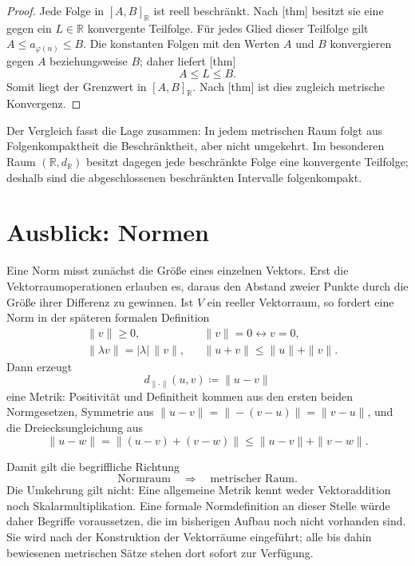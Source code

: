 \documentclass[main.tex]{subfiles}
\begin{document}
\begin{proof}
Jede Folge in \([A,B]_{\mathbb R}\) ist reell beschränkt. Nach
[thm] besitzt sie eine gegen
ein \(L\in\mathbb R\) konvergente Teilfolge. Für jedes Glied dieser
Teilfolge gilt \(A\leq a_{\varphi(n)}\leq B\). Die konstanten Folgen mit den
Werten \(A\) und \(B\) konvergieren gegen \(A\) beziehungsweise \(B\); daher
liefert
[thm]
\[
 A\leq L\leq B.
\]
Somit liegt der Grenzwert in \([A,B]_{\mathbb R}\). Nach
[thm] ist dies zugleich
metrische Konvergenz.
\end{proof}

Der Vergleich fasst die Lage zusammen: In jedem metrischen Raum folgt aus
Folgenkompaktheit die Beschränktheit, aber nicht umgekehrt. Im besonderen
Raum \((\mathbb R,d_{\mathbb R})\) besitzt dagegen jede beschränkte Folge
eine konvergente Teilfolge; deshalb sind die abgeschlossenen beschränkten
Intervalle folgenkompakt.

\chapter{Ausblick: Normen}

Eine Norm misst zunächst die Größe eines einzelnen Vektors. Erst die
Vektorraumoperationen erlauben es, daraus den Abstand zweier Punkte durch die
Größe ihrer Differenz zu gewinnen. Ist \(V\) ein reeller Vektorraum, so
fordert eine Norm in der späteren formalen Definition
\[
\begin{aligned}
 &\|v\|\geq0,
 &&\|v\|=0\leftrightarrow v=0,\\
 &\|\lambda v\|=|\lambda|\,\|v\|,
 &&\|u+v\|\leq\|u\|+\|v\|.
\end{aligned}
\]
Dann erzeugt
\[
 d_{\|\cdot\|}(u,v)\coloneqq\|u-v\|
\]
eine Metrik: Positivität und Definitheit kommen aus den ersten beiden
Normgesetzen, Symmetrie aus
\(\|u-v\|=\|-(v-u)\|=\|v-u\|\), und die Dreiecksungleichung aus
\[
 \|u-w\|=\|(u-v)+(v-w)\|
 \leq\|u-v\|+\|v-w\|.
\]

Damit gilt die begriffliche Richtung
\[
 \text{Normraum}\quad\Longrightarrow\quad\text{metrischer Raum}.
\]
Die Umkehrung gilt nicht: Eine allgemeine Metrik kennt weder Vektoraddition
noch Skalarmultiplikation. Eine formale Normdefinition an dieser Stelle würde
daher Begriffe voraussetzen, die im bisherigen Aufbau noch nicht vorhanden
sind. Sie wird nach der Konstruktion der Vektorräume eingeführt; alle bis
dahin bewiesenen metrischen Sätze stehen dort sofort zur Verfügung.
\end{document}
